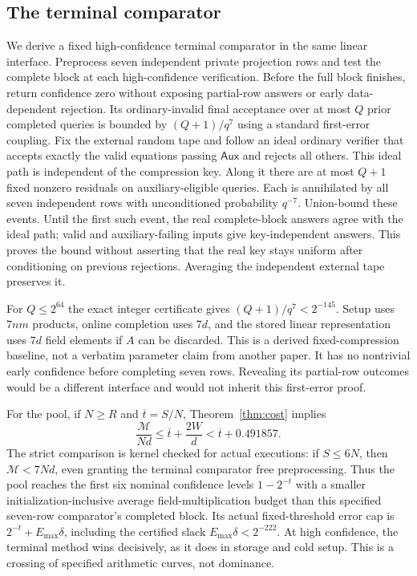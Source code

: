 \documentclass[11pt,letterpaper]{article}
\theoremstyle{definition}
\newcommand{\Aux}{\mathsf{Aux}}
\newcommand{\Emax}{E_{\max}}
\begin{document}
\subsection{The terminal comparator}
We derive a fixed high-confidence terminal comparator in the same linear interface. Preprocess seven independent private projection rows and test the complete block at each high-confidence verification. Before the full block finishes, return confidence zero without exposing partial-row answers or early data-dependent rejection. Its ordinary-invalid final acceptance over at most $Q$ prior completed queries is bounded by $(Q+1)/q^7$ using a standard first-error coupling. Fix the external random tape and follow an ideal ordinary verifier that accepts exactly the valid equations passing $\Aux$ and rejects all others. This ideal path is independent of the compression key. Along it there are at most $Q+1$ fixed nonzero residuals on auxiliary-eligible queries. Each is annihilated by all seven independent rows with unconditioned probability $q^{-7}$. Union-bound these events. Until the first such event, the real complete-block answers agree with the ideal path; valid and auxiliary-failing inputs give key-independent answers. This proves the bound without asserting that the real key stays uniform after conditioning on previous rejections. Averaging the independent external tape preserves it.

For $Q\le2^{64}$ the exact integer certificate gives $(Q+1)/q^7<2^{-145}$. Setup uses $7nm$ products, online completion uses $7d$, and the stored linear representation uses $7d$ field elements if $A$ can be discarded. This is a derived fixed-compression baseline, not a verbatim parameter claim from another paper. It has no nontrivial early confidence before completing seven rows. Revealing its partial-row outcomes would be a different interface and would not inherit this first-error proof.

For the pool, if $N\ge R$ and $\overline t=S/N$, Theorem~\ref{thm:cost} implies
\[
 \frac{\mathcal M}{Nd}
 \le \overline t+\frac{2W}{d}
 <\overline t+0.491857.
\]
The strict comparison is kernel checked for actual executions: if $S\le6N$, then $\mathcal M<7Nd$, even granting the terminal comparator free preprocessing. Thus the pool reaches the first six nominal confidence levels $1-2^{-t}$ with a smaller initialization-inclusive average field-multiplication budget than this specified seven-row comparator's completed block. Its actual fixed-threshold error cap is $2^{-t}+\Emax\delta$, including the certified slack $\Emax\delta<2^{-222}$. At high confidence, the terminal method wins decisively, as it does in storage and cold setup. This is a crossing of specified arithmetic curves, not dominance.
\end{document}
